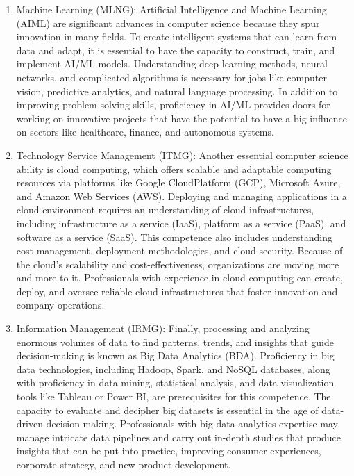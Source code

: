 \documentclass[a4paper, 11pt]{report}
\begin{document}
\begin{enumerate}
    \item Machine Learning (MLNG):
Artificial Intelligence and Machine Learning (AIML) are significant advances in computer science because they spur innovation in many fields. To create intelligent systems that can learn from data and adapt, it is essential to have the capacity to construct, train, and implement AI/ML models. Understanding deep learning methods, neural networks, and complicated algorithms is necessary for jobs like computer vision, predictive analytics, and natural language processing. In addition to improving problem-solving skills, proficiency in AI/ML provides doors for working on innovative projects that have the potential to have a big influence on sectors like healthcare, finance, and autonomous systems.

    \item Technology Service Management (ITMG):
Another essential computer science ability is cloud computing, which offers scalable and adaptable computing resources via platforms like Google CloudPlatform (GCP), Microsoft Azure, and Amazon Web Services (AWS). Deploying and managing applications in a cloud environment requires an understanding of cloud infrastructures, including infrastructure as a service (IaaS), platform as a service (PaaS), and software as a service (SaaS). This competence also includes understanding cost management, deployment methodologies, and cloud security. Because of the cloud's scalability and cost-effectiveness, organizations are moving more and more to it. Professionals with experience in cloud computing can create, deploy, and oversee reliable cloud infrastructures that foster innovation and company operations.

    \item Information Management (IRMG):
Finally, processing and analyzing enormous volumes of data to find patterns, trends, and insights that guide decision-making is known as Big Data Analytics (BDA). Proficiency in big data technologies, including Hadoop, Spark, and NoSQL databases, along with proficiency in data mining, statistical analysis, and data visualization tools like Tableau or Power BI, are prerequisites for this competence. The capacity to evaluate and decipher big datasets is essential in the age of data-driven decision-making. Professionals with big data analytics expertise may manage intricate data pipelines and carry out in-depth studies that produce insights that can be put into practice, improving consumer experiences, corporate strategy, and new product development.

\end{enumerate}
\end{document}
